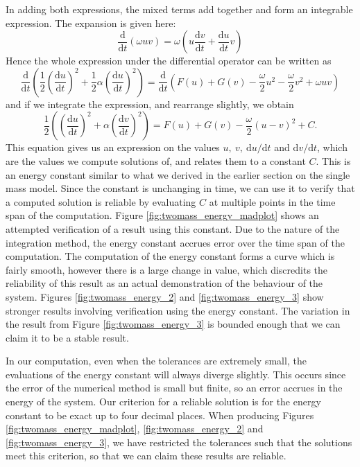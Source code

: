 In adding both expressions, the mixed terms add together and form an integrable expression.
The expansion is given here:
\begin{equation*}
    \frac{\mathrm{d}}{\mathrm{d}t}(\omega uv) = \omega \left( u \frac{\mathrm{d}v}{\mathrm{d}t} + \frac{\mathrm{d}u}{\mathrm{d}t} v \right)
\end{equation*}
Hence the whole expression under the differential operator can be written as
\begin{equation*}
    \frac{\mathrm{d}}{\mathrm{d}t}\left(
        \frac{1}{2}\left(\frac{\mathrm{d}u}{\mathrm{d}t}\right)^2 + \frac{1}{2}\alpha\left(\frac{\mathrm{d}u}{\mathrm{d}t}\right)^2
    \right) = \frac{\mathrm{d}}{\mathrm{d}t}\left(
        F(u) + G(v) - \frac{\omega}{2}u^2 -\frac{\omega}{2}v^2 + \omega uv
    \right) 
\end{equation*}
and if we integrate the expression, and rearrange slightly, we obtain
\begin{equation}
    \frac{1}{2}\left(
        \left(\frac{\mathrm{d}u}{\mathrm{d}t}\right)^2 + \alpha \left(\frac{\mathrm{d}v}{\mathrm{d}t}\right)^2
    \right) = F(u) + G(v) - \frac{\omega}{2}(u-v)^2 + C.
    \label{eqn:twomass_energy_constant}
\end{equation}
This equation gives us an expression on the values \(u,~v,~\mathrm{d}u/\mathrm{d}t\) and \(\mathrm{d}v/\mathrm{d}t\),
which are the values we compute solutions of, and relates them to a constant $C$.
This is an energy constant similar to what we derived in the earlier section on the single mass model.
Since the constant is unchanging in time, we can use it to verify that a computed solution is reliable by evaluating $C$ at multiple points in the time span of the computation.
Figure \ref{fig:twomass_energy_madplot} shows an attempted verification of a result using this constant.
Due to the nature of the integration method,
the energy constant accrues error over the time span of the computation.
The computation of the energy constant forms a curve which is fairly smooth,
however there is a large change in value,
which discredits the reliability of this result as an actual demonstration of the behaviour of the system.
Figures \ref{fig:twomass_energy_2} and \ref{fig:twomass_energy_3} show stronger results involving verification using the energy constant.
The variation in the result from Figure \ref{fig:twomass_energy_3} is bounded enough that we can claim it to be a stable result.

In our computation, even when the tolerances are extremely small,
the evaluations of the energy constant will always diverge slightly.
This occurs since the error of the numerical method is small but finite,
so an error accrues in the energy of the system.
Our criterion for a reliable solution is for the energy constant to be exact up to four decimal places.
When producing Figures \ref{fig:twomass_energy_madplot}, \ref{fig:twomass_energy_2} and \ref{fig:twomass_energy_3}, we have restricted the tolerances such that the solutions meet this criterion,
so that we can claim these results are reliable.

